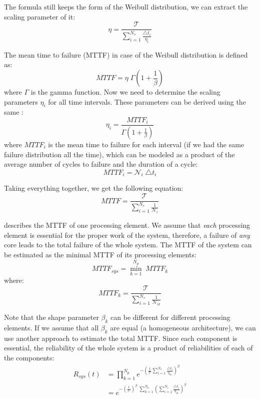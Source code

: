 The formula still keeps the form of the Weibull distribution, we can extract the scaling parameter of it:
\[
  \eta = \frac{\mathcal{T}}{\sum_{i=1}^{N_s} \frac{\triangle t_i}{\eta_i}}
\]

The mean time to failure (MTTF) in case of the Weibull distribution is defined as:
\begin{equation} \label{eq:general-mttf}
  MTTF = \eta \; \Gamma(1 + \frac{1}{\beta})
\end{equation}
where $\Gamma$ is the gamma function. Now we need to determine the scaling parameters $\eta_i$ for all time intervals. These parameters can be derived using the same :
\[
  \eta_i = \frac{MTTF_i}{\Gamma(1 + \frac{1}{\beta})}
\]
where $MTTF_i$ is the mean time to failure for each interval (if we had the same failure distribution all the time), which can be modeled as a product of the average number of cycles to failure  and the duration of a cycle:
\[
  MTTF_i = \mathcal{N}_i \; \triangle t_i
\]

Taking everything together, we get the following equation:
\begin{equation} \label{eq:one-mttf}
  MTTF = \frac{\mathcal{T}}{\sum_{i=1}^{N_s} \frac{1}{\mathcal{N}_i}}
\end{equation}

 describes the MTTF of one processing element. We assume that \emph{each} processing element is essential for the proper work of the system, therefore, a failure of \emph{any} core leads to the total failure of the whole system. The MTTF of the system can be estimated as the minimal MTTF of its processing elements:
\[
  MTTF_{sys} = \min_{k=1}^{N_p} \; MTTF_k
\]
where:
\[
  MTTF_k = \frac{\mathcal{T}}{\sum_{i=1}^{N_s} \frac{1}{\mathcal{N}_{ik}}}
\]

Note that the shape parameter $\beta_k$ can be different for different processing elements. If we assume that all $\beta_k$ are equal (a homogeneous architecture), we can use another approach to estimate the total MTTF. Since each component is essential, the reliability of the whole system is a product of reliabilities of each of the components:
\begin{align*}
  R_{sys}(t) & = \prod_{k=1}^{N_p} e^{-\left( \frac{t}{\mathcal{T}} \sum_{i=1}^{N_s} \frac{\triangle t_i}{\eta_{ik}} \right)^{\beta}} \\
  & = e^{- \left(\frac{t}{\mathcal{T}}\right)^{\beta} \; \sum_{k = 1}^{N_p} \left(  \sum_{i=1}^{N_s} \frac{\triangle t_i}{\eta_{ik}} \right)^{\beta}}
\end{align*}

